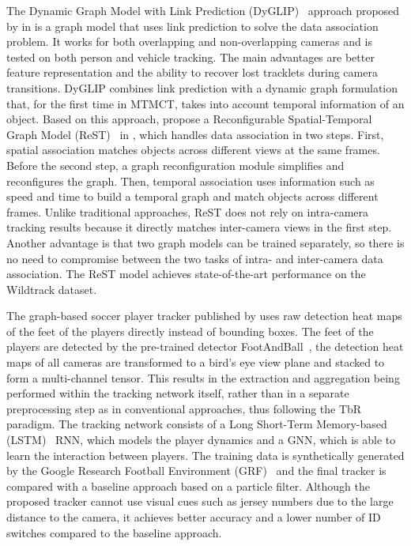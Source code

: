 The Dynamic Graph Model with Link Prediction (DyGLIP)~\cite{Quach21} approach proposed by \citeauthor{Quach21} in \citeyear{Quach21} is a graph model that uses link prediction to solve the data association problem. It works for both overlapping and non-overlapping cameras and is tested on both person and vehicle tracking. The main advantages are better feature representation and the ability to recover lost tracklets during camera transitions. DyGLIP combines link prediction with a dynamic graph formulation that, for the first time in MTMCT, takes into account temporal information of an object. Based on this approach, \citeauthor{Cheng23} propose a Reconfigurable Spatial-Temporal Graph Model (ReST)~\cite{Cheng23} in \citeyear{Cheng23}, which handles data association in two steps. First, spatial association matches objects across different views at the same frames. Before the second step, a graph reconfiguration module simplifies and reconfigures the graph. Then, temporal association uses information such as speed and time to build a temporal graph and match objects across different frames. Unlike traditional approaches, ReST does not rely on intra-camera tracking results because it directly matches inter-camera views in the first step. Another advantage is that two graph models can be trained separately, so there is no need to compromise between the two tasks of intra- and inter-camera data association. The ReST model achieves state-of-the-art performance on the Wildtrack dataset.

The graph-based soccer player tracker published by \textcite{Komorowski22} uses raw detection heat maps of the feet of the players directly instead of bounding boxes. The feet of the players are detected by the pre-trained detector FootAndBall~\cite{Komorowski20}, the detection heat maps of all cameras are transformed to a bird's eye view plane and stacked to form a multi-channel tensor. This results in the extraction and aggregation being performed within the tracking network itself, rather than in a separate preprocessing step as in conventional approaches, thus following the TbR paradigm. The tracking network consists of a Long Short-Term Memory-based (LSTM)~\cite{Gers02} RNN, which models the player dynamics and a GNN, which is able to learn the interaction between players. The training data is synthetically generated by the Google Research Football Environment (GRF)~\cite{Kurach19} and the final tracker is compared with a baseline approach based on a particle filter. Although the proposed tracker cannot use visual cues such as jersey numbers due to the large distance to the camera, it achieves better accuracy and a lower number of ID switches compared to the baseline approach.

